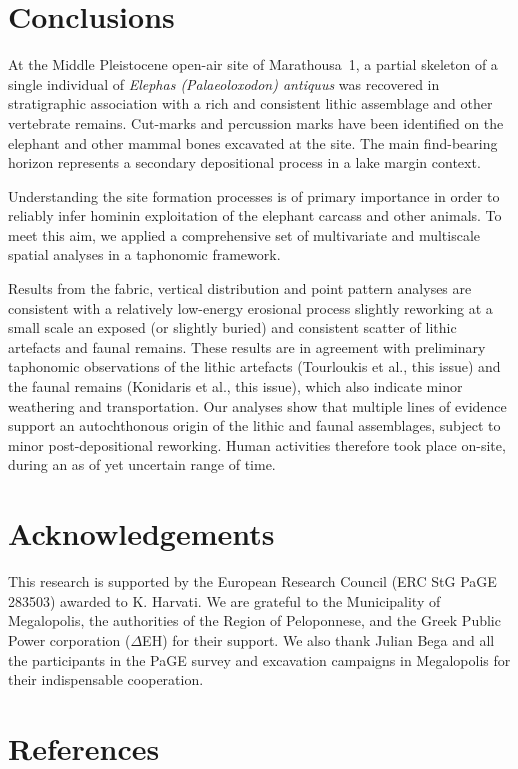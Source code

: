 \documentclass[preprint,authoryear,times]{elsarticle} %
\begin{document}
\section{Conclusions}

At the Middle Pleistocene open-air site of Marathousa~1, a partial skeleton of a single individual of \emph{Elephas (Palaeoloxodon) antiquus} was recovered in stratigraphic association with a rich and consistent lithic assemblage and other vertebrate remains. Cut-marks and percussion marks have been identified on the elephant and other mammal bones excavated at the site. The main find-bearing horizon represents a secondary depositional process in a lake margin context.

Understanding the site formation processes is of primary importance in order to reliably infer hominin exploitation of the elephant carcass and other animals. To meet this aim, we applied a comprehensive set of multivariate and multiscale spatial analyses in a taphonomic framework.

Results from the fabric, vertical distribution and point pattern analyses are consistent with a relatively low-energy erosional process slightly reworking at a small scale an exposed (or slightly buried) and consistent scatter of lithic artefacts and faunal remains. These results are in agreement with preliminary taphonomic observations of the lithic artefacts (Tourloukis et al., this issue) and the faunal remains (Konidaris et al., this issue), which also indicate minor weathering and transportation. Our analyses show that multiple lines of evidence support an autochthonous origin of the lithic and faunal assemblages, subject to minor post-depositional reworking. Human activities therefore took place on-site, during an as of yet uncertain range of time.

\section*{Acknowledgements}

This research is supported by the European Research Council (ERC StG PaGE 283503) awarded to K. Harvati. We are grateful to the Municipality of Megalopolis, the authorities of the Region of Peloponnese, and the Greek Public Power corporation ($\Delta$EH) for their support. We also thank Julian Bega and all the participants in the PaGE survey and excavation campaigns in Megalopolis for their indispensable cooperation. %
 
\section*{References}



\end{document}
